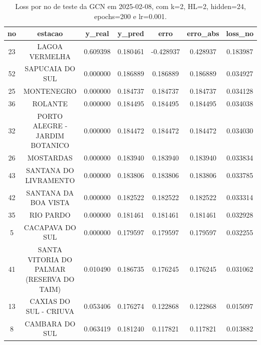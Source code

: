 \begin{table}[h]
\centering
\caption{Loss por no de teste da GCN em 2025-02-08, com k=2, HL=2, hidden=24, epochs=200 e lr=0.001.}
\label{tab:gcn_loss_k2_hl2_h24_e200_d20250208}
\begin{tabular}{ccccccc}
\toprule
no & estacao & y\_real & y\_pred & erro & erro\_abs & loss\_no \\
\midrule
23 & LAGOA VERMELHA & 0.609398 & 0.180461 & -0.428937 & 0.428937 & 0.183987 \\
52 & SAPUCAIA DO SUL & 0.000000 & 0.186889 & 0.186889 & 0.186889 & 0.034927 \\
25 & MONTENEGRO & 0.000000 & 0.184737 & 0.184737 & 0.184737 & 0.034128 \\
36 & ROLANTE & 0.000000 & 0.184495 & 0.184495 & 0.184495 & 0.034038 \\
32 & PORTO ALEGRE - JARDIM BOTANICO & 0.000000 & 0.184472 & 0.184472 & 0.184472 & 0.034030 \\
26 & MOSTARDAS & 0.000000 & 0.183940 & 0.183940 & 0.183940 & 0.033834 \\
43 & SANTANA DO LIVRAMENTO & 0.000000 & 0.183806 & 0.183806 & 0.183806 & 0.033785 \\
42 & SANTANA DA BOA VISTA & 0.000000 & 0.182522 & 0.182522 & 0.182522 & 0.033314 \\
35 & RIO PARDO & 0.000000 & 0.181461 & 0.181461 & 0.181461 & 0.032928 \\
5 & CACAPAVA DO SUL & 0.000000 & 0.179597 & 0.179597 & 0.179597 & 0.032255 \\
41 & SANTA VITORIA DO PALMAR (RESERVA DO TAIM) & 0.010490 & 0.186735 & 0.176245 & 0.176245 & 0.031062 \\
13 & CAXIAS DO SUL - CRIUVA & 0.053406 & 0.176274 & 0.122868 & 0.122868 & 0.015097 \\
8 & CAMBARA DO SUL & 0.063419 & 0.181240 & 0.117821 & 0.117821 & 0.013882 \\
\bottomrule
\end{tabular}
\end{table}
